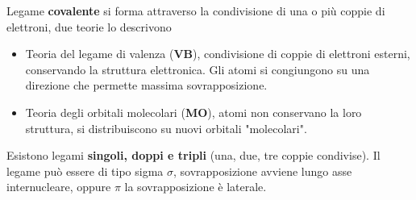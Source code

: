 \documentclass[11pt, a4paper, openright]{book}
\begin{document}
Legame \textbf{covalente} si forma attraverso la condivisione di una o più coppie di elettroni, due teorie lo descrivono \begin{itemize}
    \item Teoria del legame di valenza (\textbf{VB}), condivisione di coppie di elettroni esterni, conservando la struttura elettronica. Gli atomi si congiungono su una direzione che permette massima sovrapposizione. 
    \item Teoria degli orbitali molecolari (\textbf{MO}), atomi non conservano la loro struttura, si distribuiscono su nuovi orbitali "molecolari".
\end{itemize}
Esistono legami \textbf{singoli, doppi e tripli} (una, due, tre coppie condivise). Il legame può essere di tipo sigma $\sigma$, sovrapposizione avviene lungo asse internucleare, oppure $\pi$ la sovrapposizione è laterale.
\newpage
\end{document}
